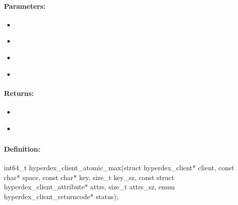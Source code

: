 \paragraph{Parameters:}
\begin{itemize}[noitemsep]
\item {}\\

\item {}\\

\item {}\\

\item {}\\

\end{itemize}

\paragraph{Returns:}
\begin{itemize}[noitemsep]
\item {}\\

\item {}\\

\end{itemize}

\pagebreak
\subsubsection{}
\label{api:c:atomic_max}


\paragraph{Definition:}
\begin{ccode}
int64_t hyperdex_client_atomic_max(struct hyperdex_client* client,
        const char* space,
        const char* key, size_t key_sz,
        const struct hyperdex_client_attribute* attrs, size_t attrs_sz,
        enum hyperdex_client_returncode* status);
\end{ccode}

